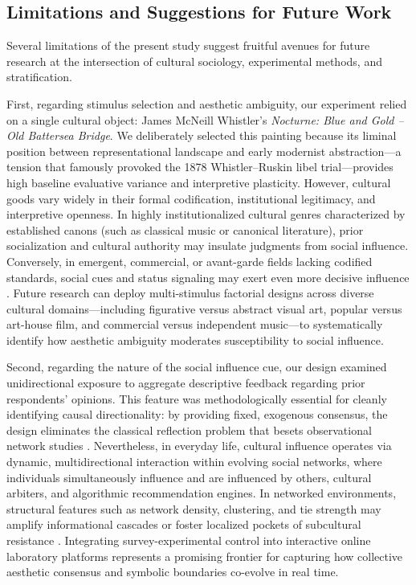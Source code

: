 \documentclass[12pt, letterpaper]{article}
\begin{document}
\subsection{Limitations and Suggestions for Future Work}
Several limitations of the present study suggest fruitful avenues for future research at the intersection of cultural sociology, experimental methods, and stratification.

First, regarding stimulus selection and aesthetic ambiguity, our experiment relied on a single cultural object: James McNeill Whistler's \textit{Nocturne: Blue and Gold -- Old Battersea Bridge}. We deliberately selected this painting because its liminal position between representational landscape and early modernist abstraction---a tension that famously provoked the 1878 Whistler--Ruskin libel trial---provides high baseline evaluative variance and interpretive plasticity. However, cultural goods vary widely in their formal codification, institutional legitimacy, and interpretive openness. In highly institutionalized cultural genres characterized by established canons (such as classical music or canonical literature), prior socialization and cultural authority may insulate judgments from social influence. Conversely, in emergent, commercial, or avant-garde fields lacking codified standards, social cues and status signaling may exert even more decisive influence \citep{childress2012cultural-0cc, wohl2015community-2d2}. Future research can deploy multi-stimulus factorial designs across diverse cultural domains---including figurative versus abstract visual art, popular versus art-house film, and commercial versus independent music---to systematically identify how aesthetic ambiguity moderates susceptibility to social influence.

Second, regarding the nature of the social influence cue, our design examined unidirectional exposure to aggregate descriptive feedback regarding prior respondents' opinions. This feature was methodologically essential for cleanly identifying causal directionality: by providing fixed, exogenous consensus, the design eliminates the classical reflection problem that besets observational network studies \citep{centola2011experimental-93e, aral2009distinguishing-3c0, shalizi2011homophily-aab}. Nevertheless, in everyday life, cultural influence operates via dynamic, multidirectional interaction within evolving social networks, where individuals simultaneously influence and are influenced by others, cultural arbiters, and algorithmic recommendation engines. In networked environments, structural features such as network density, clustering, and tie strength may amplify informational cascades or foster localized pockets of subcultural resistance \citep{mark2003culture-ed5, lewis2018conversion-9be}. Integrating survey-experimental control into interactive online laboratory platforms represents a promising frontier for capturing how collective aesthetic consensus and symbolic boundaries co-evolve in real time.
\end{document}
